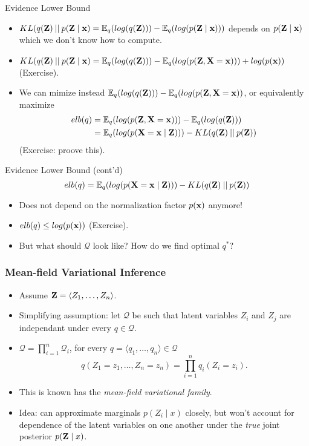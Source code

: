 \documentclass{beamer}
\newcommand{\mmid}{\mathbin{{\mid}{\mid}}}
\begin{document}
\begin{frame}{Evidence Lower Bound}
  \begin{itemize}
  \item $KL(q({\bf Z}) \mmid p({\bf Z} \mid {\bf x}) = \mathbb{E}_{q}(log(q({\bf Z}))) - \mathbb{E}_{q}(log(p({\bf Z} \mid {\bf x})))$ depends on $p({\bf Z} \mid {\bf x})$ which we don't know how to compute.
  \item $KL(q({\bf Z}) \mmid p({\bf Z} \mid {\bf x}) = \mathbb{E}_{q}(log(q({\bf Z}))) - \mathbb{E}_{q}(log(p({\bf Z}, {\bf X}={\bf x}))) + log(p({\bf x}))$ (Exercise).
  \item We can mimize instead $\mathbb{E}_{q}(log(q({\bf Z}))) - \mathbb{E}_{q}(log(p({\bf Z}, {\bf X}={\bf x}))$, or equivalently maximize
    \[
    \begin{aligned}
      elb(q) &= \mathbb{E}_{q}(log(p({\bf Z}, {\bf X} = {\bf x}))) - \mathbb{E}_{q}(log(q({\bf Z})))\\
      &= \mathbb{E}_{q}(log(p({\bf X} = {\bf x} \mid {\bf Z}))) - KL(q({\bf Z}) \mmid p({\bf Z}))
    \end{aligned}
    \]
    (Exercise: proove this).
  \end{itemize}
\end{frame}

\begin{frame}{Evidence Lower Bound (cont'd)}
  \[elb(q) = \mathbb{E}_{q}(log(p({\bf X} = {\bf x} \mid {\bf Z}))) - KL(q({\bf Z}) \mmid p({\bf Z}))\]
  \begin{itemize}
  \item Does not depend on the normalization factor $p({\bf x})$ anymore!
  \item $elb(q) \le log(p({\bf x}))$ (Exercise).
  \item But what should $\mathcal{Q}$ look like? How do we find optimal $q^*$?
  \end{itemize}
\end{frame}


\begin{frame}
  \frametitle{Mean-field Variational Inference}
  \begin{itemize}
  \item Assume ${\bf Z} = \langle Z_1, \dots, Z_n\rangle$.
  \item Simplifying assumption: let $\mathcal{Q}$ be such that latent variables $Z_i$ and $Z_j$ are independant under every $q \in \mathcal{Q}$.
  \item $\mathcal{Q} = \prod^n_{i=1} \mathcal{Q}_i$, for every $q = \langle q_1, \dots, q_n   \rangle \in \mathcal{Q}$
    \[q(Z_1 = z_1,\dots, Z_n = z_n) = \prod^n_{i = 1} q_i(Z_i = z_i). \]
  \item This is known has the \emph{mean-field variational family}.
  \item Idea: can approximate marginals $p(Z_i \mid x)$ closely, but won't account for dependence of the latent variables on one another under the \emph{true} joint posterior $p({\bf Z} \mid x)$.
  \end{itemize}
\end{frame}
\end{document}
